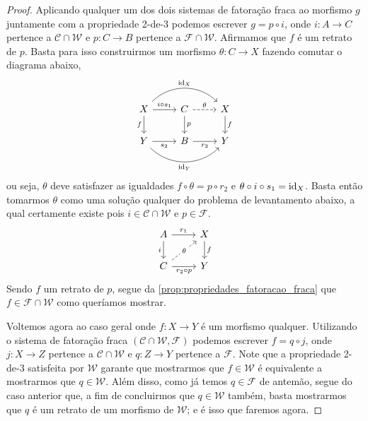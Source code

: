 \begin{proof}
  Aplicando qualquer um dos dois sistemas de fatoração fraca ao morfismo $g$ juntamente com a propriedade 2-de-3 podemos escrever $g = p \circ i$, onde $i: A \to C$ pertence a $\mathcal{C} \cap \mathcal{W}$ e $p: C \to B$ pertence a $\mathcal{F} \cap \mathcal{W}$.
  Afirmamos que $f$ é um retrato de $p$.
  Basta para isso construirmos um morfismo $\theta: C \to X$ fazendo comutar o diagrama abaixo,
  \begin{displaymath}
    \begin{tikzcd}
      X
      \arrow[r, "i \circ s_1"]
      \arrow[d, "f" swap]
      \arrow[rr, bend left=45, "\id_X"]
      & C
      \arrow[r, dashed, "\theta"]
      \arrow[d, "p"]
      & X
      \arrow[d, "f"]
      \\ Y
      \arrow[r, "s_2" swap]
      \arrow[rr, bend right=45, "\id_Y" swap]
      & B
      \arrow[r, "r_2" swap]
      & Y
    \end{tikzcd}
  \end{displaymath}
  ou seja, $\theta$ deve satisfazer as igualdades $f \circ \theta = p \circ r_2$ e $\theta \circ i \circ s_1 = \mathrm{id}_X$.
  Basta então tomarmos $\theta$ como uma solução qualquer do problema de levantamento abaixo, a qual certamente existe pois $i \in \mathcal{C} \cap \mathcal{W}$ e $p \in \mathcal{F}$.
  \begin{displaymath}
    \begin{tikzcd}
      A
      \arrow[r, "r_1"]
      \arrow[d, "i" swap]
      & X
      \arrow[d, "f"]
      \\ C
      \arrow[r, "r_2 \circ p" swap]
      \arrow[ru, dashed, "\theta" description]
      & Y
    \end{tikzcd}
  \end{displaymath}
  Sendo $f$ um retrato de $p$, segue da \cref{prop:propriedades_fatoracao_fraca} que $f \in \mathcal{F} \cap \mathcal{W}$ como queríamos mostrar.

  Voltemos agora ao caso geral onde $f: X \to Y$ é um morfismo qualquer.
  Utilizando o sistema de fatoração fraca $(\mathcal{C} \cap \mathcal{W},\mathcal{F})$ podemos escrever $f = q \circ j$, onde $j: X \to Z$ pertence a $\mathcal{C} \cap \mathcal{W}$ e $q: Z \to Y$ pertence a $\mathcal{F}$.
  Note que a propriedade 2-de-3 satisfeita por $\mathcal{W}$ garante que mostrarmos que $f \in \mathcal{W}$ é equivalente a mostrarmos que $q \in \mathcal{W}$.
  Além disso, como já temos $q \in \mathcal{F}$ de antemão, segue do caso anterior que, a fim de concluirmos que $q \in \mathcal{W}$ também, basta mostrarmos que $q$ é um retrato de um morfismo de $\mathcal{W}$; e é isso que faremos agora.


\end{proof}
